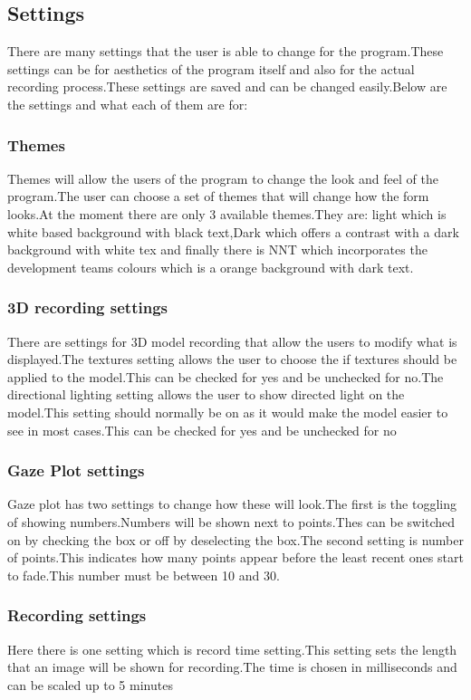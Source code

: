 \subsection{Settings}
There are many settings that the user is able to change for the program.These settings can be for aesthetics of the program itself and also for the actual recording process.These settings are saved and can be changed easily.Below are the settings and what each of them are for:
\subsubsection{Themes}
Themes will allow the users of the program to change the look and feel of the program.The user can choose a set of themes that will change how the form looks.At the moment there are only 3 available themes.They are: light which is white based background with black  text,Dark which offers a contrast with a dark background with white tex and finally there is NNT which incorporates the development teams colours which is a orange background with dark text. 
\subsubsection{3D recording settings}
There are settings for 3D model recording that allow the users to modify what is displayed.The textures setting allows the user to choose the if textures should be applied to the model.This can be checked for yes and be unchecked for no.The directional lighting setting allows the user to show directed light on the model.This setting should normally be on as it would make the model easier to see in most cases.This can be checked for yes and be unchecked for no
\subsubsection{Gaze Plot settings}
Gaze plot has two settings to change how these will look.The first is the toggling of showing numbers.Numbers will be shown next to points.Thes can be switched on by checking the box or off by deselecting the box.The second setting is number of points.This indicates how many points appear before the least recent ones start to fade.This number must be between 10 and 30.
\subsubsection{Recording settings}
Here there is one setting which is record time setting.This setting sets the length that an image will be shown for recording.The time is chosen in milliseconds and can be scaled up to 5 minutes